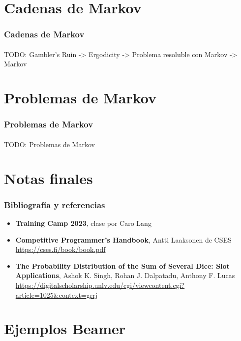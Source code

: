 \documentclass{beamer}
\begin{document}
\newcommand{\SECTIONC}{Cadenas de Markov}
\section{\SECTIONC}

\begin{frame}
  \frametitle{\SECTIONC}
  \framesubtitle{}

  TODO: Gambler's Ruin -> Ergodicity -> Problema resoluble con Markov -> Markov
\end{frame}

\newcommand{\SECTIOND}{Problemas de Markov}
\section{\SECTIOND}

\begin{frame}
  \frametitle{\SECTIOND}
  \framesubtitle{}

  TODO: Problemas de Markov
\end{frame}


\section{Notas finales}

\begin{frame}
  \frametitle{Bibliografía y referencias}
  
  \begin{itemize}
  \item \textbf{Training Camp 2023}, clase por Caro Lang \\
  \item \textbf{Competitive Programmer's Handbook}, Antti Laaksonen de CSES \\
      \href{https://cses.fi/book/book.pdf}{https://cses.fi/book/book.pdf}
    \item \textbf{The Probability Distribution of the Sum of Several Dice: Slot Applications}, Ashok K. Singh, Rohan J. Dalpatadu, Anthony F. Lucas \\
      \href{https://digitalscholarship.unlv.edu/cgi/viewcontent.cgi?article=1025&context=grrj}{https://digitalscholarship.unlv.edu/cgi/viewcontent.cgi?article=1025\&context=grrj}
  \end{itemize}
\end{frame}

\section{Ejemplos Beamer}
\end{document}
